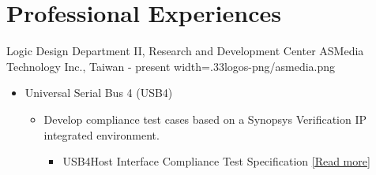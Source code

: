 \documentclass{cvclass}
\newcommand{\simplemmyy}[3]{\shortmmyyformat\formatdate{#3}{#2}{#1}}
\begin{document}
\makeinfo


\section{Professional Experiences}

    {Logic Design Department II, Research and Development Center}
    {ASMedia Technology Inc., Taiwan}
    {\simplemmyy{2023}{7}{17} - present}
    {width=.33\linewidth}{logos-png/asmedia.png}
    {\begin{itemize}
        \item Universal Serial Bus 4 (USB4\textsuperscript{\tiny\textregistered})
        \begin{itemize}
            \item Develop compliance test cases based on a Synopsys\textsuperscript{\tiny\textregistered} Verification IP integrated environment.
            \begin{itemize}
                \item USB4\texttrademark Host Interface Compliance Test Specification \href{https://www.usb.org/document-library/usb4-compliance-test-specification}{[Read more]}
            \end{itemize}
        \end{itemize}
    \end{itemize}}
\end{document}
